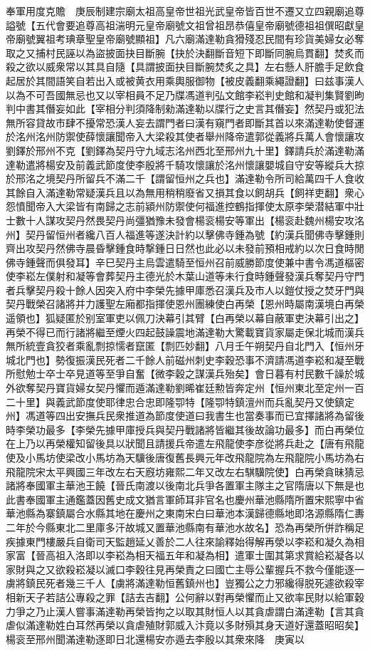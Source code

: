奉軍用度克贍　庚辰制建宗廟太祖高皇帝世祖光武皇帝皆百世不遷又立四親廟追尊謚號【五代會要追尊高祖湍明元皇帝廟號文祖曾祖昂恭僖皇帝廟號德祖祖僎昭獻皇帝廟號翼祖考琠章聖皇帝廟號顯祖】凡六廟滿達勒貪猾殘忍民間有珍貨美婦女必奪取之又捕村民誣以為盜披面抉目斷腕【抉於決翻斷音短下即斷同腕烏貫翻】焚炙而殺之欲以威衆常以其具自隨【具謂披面抉目斷腕焚炙之具】左右懸人肝膽手足飲食起居於其間語笑自若出入或被黄衣用乘輿服御物【被皮義翻乘繩證翻】曰兹事漢人以為不可吾國無忌也又以宰相員不足乃牒馮道判弘文館李崧判史館和凝判集賢劉昫判中書其僭妄如此【宰相分判須降制勑滿達勒以牒行之史言其僭妄】然契丹或犯法無所容貸故市肆不擾常恐漢人妄去謂門者曰漢有窺門者即斷其首以來滿達勒使督運於洺州洺州防禦使薛懷讓聞帝入大梁殺其使者舉州降帝遣郭從義將兵萬人會懷讓攻劉鐸於邢州不克【劉鐸為契丹守九域志洺州西北至邢州九十里】鐸請兵於滿達勒滿達勒遣將楊安及前義武節度使李殷將千騎攻懷讓於洺州懷讓嬰城自守安等縱兵大掠於邢洺之境契丹所留兵不滿二千【謂留恒州之兵也】滿達勒令所司給萬四千人食收其餘自入滿達勒常疑漢兵且以為無用稍稍廢省又損其食以飼胡兵【飼祥吏翻】衆心怨憤聞帝入大梁皆有南歸之志前潁州防禦使何福進控鶴指揮使太原李榮潜結軍中壯士數十人謀攻契丹然畏契丹尚彊猶豫未發會楊衮楊安等軍出【楊衮赴魏州楊安攻洺州】契丹留恒州者纔八百人福進等遂決計約以擊佛寺鍾為號【約漢兵聞佛寺擊鍾則齊出攻契丹然佛寺晨昏擊鍾食時撃鍾日日然也此必以未發前預相戒約以次日食時閒佛寺鍾聲而俱發耳】辛巳契丹主烏雲遣騎至恒州召前威勝節度使兼中書令馮道樞密使李崧左僕射和凝等會葬契丹主德光於木葉山道等未行食時鍾聲發漢兵奪契丹守門者兵擊契丹殺十餘人因突入府中李榮先據甲庫悉召漢兵及市人以鎧仗授之焚牙門與契丹戰榮召諸將并力護聖左廂都指揮使恩州團練使白再榮【恩州時屬南漢境白再榮遥領也】狐疑匿於别室軍吏以佩刀決幕引其臂【白再榮以幕自蔽軍吏決幕引出之】再榮不得已而行諸將繼至煙火四起鼓譟震地滿達勒大驚載寶貨家屬走保北城而漢兵無所統壹貪狡者乘亂剽掠懦者竄匿【剽匹妙翻】八月壬午朔契丹自北門入【恒州牙城北門也】勢復振漢民死者二千餘人前磁州刺史李穀恐事不濟請馮道李崧和凝至戰所慰勉士卒士卒見道等至爭自奮【微李穀之謀漢兵殆矣】會日暮有村民數千譟於城外欲奪契丹寶貨婦女契丹懼而遁滿達勒劉晞崔廷勲皆奔定州【恒州東北至定州一百二十里】與義武節度使耶律忠合忠即隆卾特【隆卾特鎮澶州而兵亂契丹又使鎮定州】馮道等四出安撫兵民衆推道為節度使道曰我書生也當奏事而已宜擇諸將為留後時李榮功最多【李榮先據甲庫授兵與契丹戰諸將皆繼其後故論功最多】而白再榮位在上乃以再榮權知留後具以狀聞且請援兵帝遣左飛龍使李彦從將兵赴之【唐有飛龍使及小馬坊使梁改小馬坊為天驥後唐復舊長興元年改飛龍院為左飛龍院小馬坊為右飛龍院宋太平興國三年改左右天廐坊雍熙二年又改左右騏驥院使】白再榮貪昧猜忌諸將奉國軍主華池王饒【晉氏南渡以後南北兵爭各置軍主隊主之官隋唐以下無是也此書奉國軍主通鑑蓋因舊史成文猶言軍師耳非官名也慶州華池縣隋所置宋熙寧中省華池縣為寨鎮屬合水縣其地在慶州之東南宋白曰華池本漢歸德縣地即洛源縣隋仁夀二年於今縣東北二里庫多汗故城又置華池縣南有華池水故名】恐為再榮所併詐稱足疾據東門樓嚴兵自衛司天監趙延乂善於二人往來諭釋始得解再滎以李崧和凝久為相家富【晉高祖入洛即以李崧為相天福五年和凝為相】遣軍士圍其第求賞給崧凝各以家財與之又欲殺崧凝以滅口李穀往見再榮責之曰國亡主辱公輩握兵不救今僅能逐一虜將鎮民死者幾三千人【虜將滿達勒恒舊鎮州也】豈獨公之力邪纔得脱死遽欲殺宰相新天子若詰公專殺之罪【詰去吉翻】公何辭以對再榮懼而止又欲率民財以給軍穀力爭之乃止漢人嘗事滿達勒再榮皆拘之以取其財恒人以其貪虐謂白滿達勒【言其貪虐似滿達勒姓白耳然再榮以貪虐殖財郭威入汴竟以多財殞其身天道好還蓋昭昭矣】楊衮至邢州聞滿達勒逐即日北還楊安亦遁去李殷以其衆來降　庚寅以